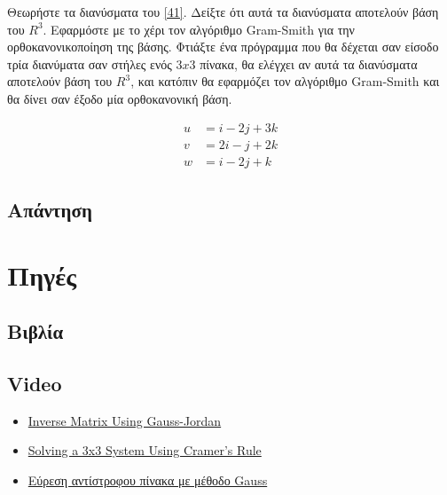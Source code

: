 \documentclass[14pt]{extreport}
\begin{document}
Θεωρήστε τα διανύσματα του \eqref{41}. Δείξτε ότι αυτά τα διανύσματα αποτελούν βάση του $R^{3}$. Εφαρμόστε με το χέρι τον αλγόριθμο Gram-Smith για την ορθοκανονικοποίηση της βάσης. Φτιάξτε ένα πρόγραμμα που θα δέχεται σαν είσοδο τρία διανύματα σαν στήλες ενός $3x3$ πίνακα, θα ελέγχει αν αυτά τα διανύσματα αποτελούν βάση του $R^{3}$, και κατόπιν θα εφαρμόζει τον αλγόριθμο Gram-Smith και θα δίνει σαν έξοδο μία ορθοκανονική βάση.

\begin{equation}
    \begin{aligned}
        u & = i - 2j + 3k \\
        v & = 2i - j + 2k \\
        w & = i - 2j + k
    \end{aligned}\label{41}
\end{equation}

\newpage
\section{Απάντηση}

\chapter{Πηγές}
\newpage

\section{Βιβλία}
\section{Video}
\begin{itemize}
    \item \href{https://www.youtube.com/watch?v=cJg2AuSFdjw}{Inverse Matrix Using Gauss-Jordan}
    \item \href{https://youtu.be/X5rDjbp0t6s}{Solving a 3x3 System Using Cramer's Rule}
    \item \href{https://youtu.be/0vB1sgebS9c}{Εύρεση αντίστροφου πίνακα με μέθοδο Gauss}
\end{itemize}
\end{document}
